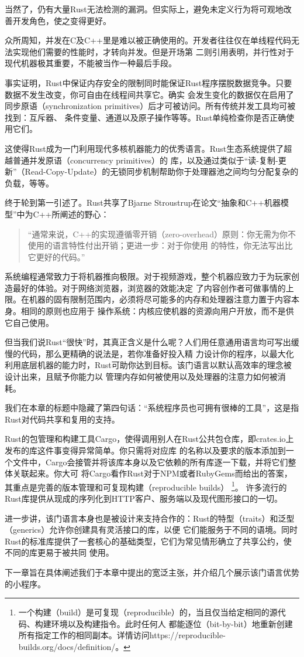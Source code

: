 \medskip
当然了，仍有大量Rust无法检测的漏洞。但实际上，避免未定义行为将可观地改善开发角色，使之变得更好。

众所周知，并发在C及C++里是难以被正确使用的。开发者往往仅在单线程代码无法实现他们需要的性能时，才转向并发。但是开场第
二则引用表明，并行性对于现代机器极其重要，不能被当作一种最后手段。

\medskip
事实证明，Rust中保证内存安全的限制同时能保证Rust程序摆脱数据竞争。只要数据不发生改变，你可自由在线程间共享它。确实
会发生变化的数据仅在启用了同步原语（synchronization primitives）后才可被访问。所有传统并发工具均可被找到：互斥器、
条件变量、通道以及原子操作等等。Rust单纯检查你是否正确使用它们。

\medskip
这使得Rust成为一门利用现代多核机器能力的优秀语言。Rust生态系统提供了超越普通并发原语（concurrency primitives）的
库，以及通过类似于“读-复制-更新”（Read-Copy-Update）的无锁同步机制帮助你于处理器池之间均匀分配复杂的负载，等等。

终于轮到第一引述了。Rust共享了Bjarne Stroustrup在论文“抽象和C++机器模型”中为C++所阐述的野心：

\smallskip
\begin{quote}
    “通常来说，C++的实现遵循零开销（zero-overhead）原则：你无需为你不使用的语言特性付出开销；更进一步：对于你使用
    的特性，你无法写出比它更好的代码。”
\end{quote}

\smallskip
系统编程通常致力于将机器推向极限。对于视频游戏，整个机器应致力于为玩家创造最好的体验。对于网络浏览器，浏览器的效能决定
了内容创作者可做事情的上限。在机器的固有限制范围内，必须将尽可能多的内存和处理器注意力置于内容本身。相同的原则也应用于
操作系统：内核应使机器的资源向用户开放，而不是供它自己使用。

\medskip
但当我们说Rust“很快”时，其真正含义是什么呢？人们用任意通用语言均可写出缓慢的代码，那么更精确的说法是，若你准备好投入精
力设计你的程序，以最大化利用底层机器的能力时，Rust可助你达到目标。该门语言以默认高效率的理念被设计出来，且赋予你能力以
管理内存如何被使用以及处理器的注意力如何被消耗。

我们在本章的标题中隐藏了第四句话：“系统程序员也可拥有很棒的工具”，这是指Rust对代码共享和复用的支持。

\medskip
Rust的包管理和构建工具Cargo，使得调用别人在Rust公共包仓库，即crates.io上发布的库这件事变得异常简单。你只需将对应库
的名称以及要求的版本添加到一个文件中，Cargo会接管并将该库本身以及它依赖的所有库逐一下载，并将它们整体关联起来。你大可
将Cargo看作Rust对于NPM或者RubyGems而给出的答案，其重点是完善的版本管理和可复现构建（reproducible builds）
\footnote{一个构建（build）是可复现（reproducible）的，当且仅当给定相同的源代码、构建环境以及构建指令。此时任何人
都能逐位（bit-by-bit）地重新创建所有指定工作的相同副本。详情访问https://reproducible-builds.org/docs/definition/。}。
许多流行的Rust库提供从现成的序列化到HTTP客户、服务端以及现代图形接口的一切。

\medskip
进一步讲，该门语言本身也是被设计来支持合作的：Rust的特型（traits）和泛型（generics）允许你创建具有灵活接口的库，以便
它们能服务于不同的语境。同时Rust的标准库提供了一套核心的基础类型，它们为常见情形确立了共享公约，使不同的库更易于被共同
使用。

\medskip
下一章旨在具体阐述我们于本章中提出的宽泛主张，并介绍几个展示该门语言优势的小程序。